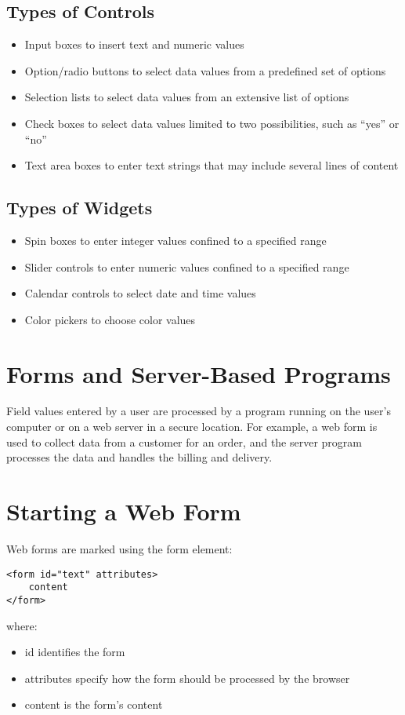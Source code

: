 \documentclass{article}
\begin{document}
\subsection{Types of Controls}
\begin{itemize}
    \item Input boxes to insert text and numeric values
    \item Option/radio buttons to select data values from a predefined set of options
    \item Selection lists to select data values from an extensive list of options
    \item Check boxes to select data values limited to two possibilities, such as “yes” or “no”
    \item Text area boxes to enter text strings that may include several lines of content
\end{itemize}

\subsection{Types of Widgets}
\begin{itemize}
    \item Spin boxes to enter integer values confined to a specified range
    \item Slider controls to enter numeric values confined to a specified range
    \item Calendar controls to select date and time values
    \item Color pickers to choose color values
\end{itemize}

\section{Forms and Server-Based Programs}
Field values entered by a user are processed by a program running on the user’s computer or on a web server in a secure location. For example, a web form is used to collect data from a customer for an order, and the server program processes the data and handles the billing and delivery.

\section{Starting a Web Form}
Web forms are marked using the form element:
\begin{lstlisting}
<form id="text" attributes>
    content
</form>
\end{lstlisting}
where:
\begin{itemize}
    \item id identifies the form
    \item attributes specify how the form should be processed by the browser
    \item content is the form’s content
\end{itemize}
\end{document}
